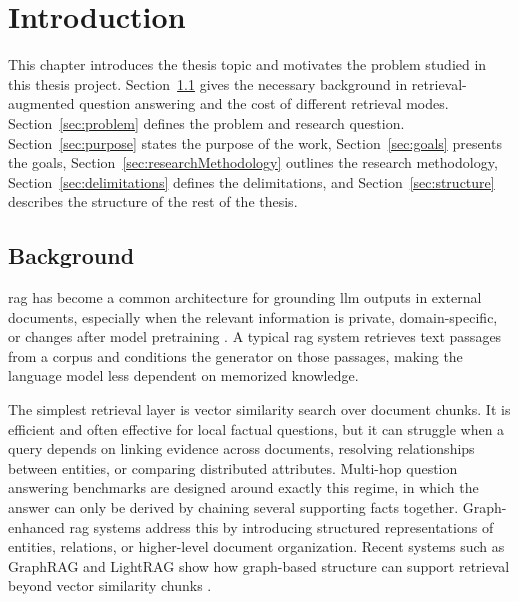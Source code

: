 \documentclass[english, bibtex]{kththesis}               %
\numberwithin{listing}{chapter}
\begin{document}
\ifnomenclature
    \cleardoublepage
    \printnomenclature
\fi

\label{pg:lastPageofPreface}
\mainmatter
\glsresetall
\renewcommand{\chaptermark}[1]{\markboth{#1}{}}
\chapter{Introduction}
\label{ch:introduction}

This chapter introduces the thesis topic and motivates the problem studied in this thesis project. Section~\ref{sec:background} gives the necessary background in retrieval-augmented question answering and the cost of different retrieval modes. Section~\ref{sec:problem} defines the problem and research question. Section~\ref{sec:purpose} states the purpose of the work, Section~\ref{sec:goals} presents the goals, Section~\ref{sec:researchMethodology} outlines the research methodology, Section~\ref{sec:delimitations} defines the delimitations, and Section~\ref{sec:structure} describes the structure of the rest of the thesis.

\section{Background}
\label{sec:background}

\Gls{rag} has become a common architecture for grounding \gls{llm} outputs in external documents, especially when the relevant information is private, domain-specific, or changes after model pretraining \cite{gao2023ragsurvey}. A typical \gls{rag} system retrieves text passages from a corpus and conditions the generator on those passages, making the language model less dependent on memorized knowledge.

The simplest retrieval layer is vector similarity search over document chunks. It is efficient and often effective for local factual questions, but it can struggle when a query depends on linking evidence across documents, resolving relationships between entities, or comparing distributed attributes. Multi-hop question answering benchmarks are designed around exactly this regime, in which the answer can only be derived by chaining several supporting facts together. Graph-enhanced \gls{rag} systems address this by introducing structured representations of entities, relations, or higher-level document organization. Recent systems such as GraphRAG and LightRAG show how graph-based structure can support retrieval beyond vector similarity chunks \cite{edge2024graphrag,lightrag2024}.
\end{document}
